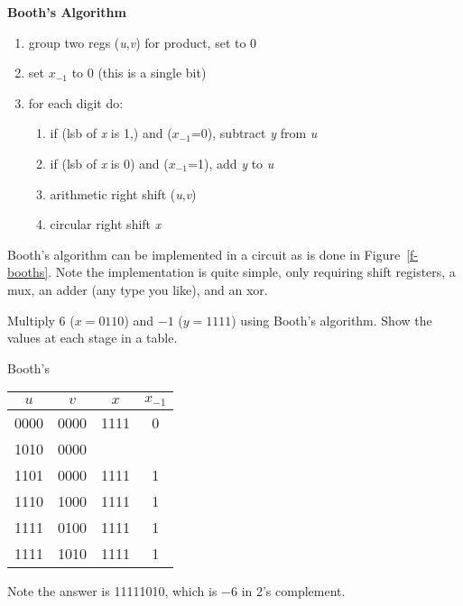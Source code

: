 \textbf{Booth's Algorithm}
\begin{enumerate}
    \item group two regs (\emph{u},\emph{v}) for product, set to 0
    \item set \emph{$x_{-1}$} to 0 (this is a single bit)
    \item for each digit do:
    \begin{enumerate}
        \item if (lsb of \emph{x} is 1,) and (\emph{$x_{-1}$}=0), subtract \emph{y} from \emph{u}
        \item if (lsb of \emph{x} is 0) and (\emph{$x_{-1}$}=1), add \emph{y} to \emph{u}
        \item arithmetic right shift (\emph{u},\emph{v})
        \item circular right shift \emph{x}
    \end{enumerate}
\end{enumerate}

Booth's algorithm can be implemented in a circuit as is done in Figure~\ref{f-booths}.  Note the implementation is quite simple, only requiring shift registers, a mux, an adder (any type you like), and an xor.



\begin{example}
Multiply $6$ ($x=0110$) and $-1$ ($y=1111$) using Booth's algorithm.  Show the values at each stage in a table.

       {\color{ans}
       Booth's

       \begin{tabular}{cccc}
         $u$ & $v$ & $x$ & $x_{-1}$ \\ \hline
         0000 & 0000 & 1111 & 0 \\ \hline
         1010 & 0000 &   &   \\
         1101 & 0000 & 1111 & 1 \\ \hline
         1110 & 1000 & 1111 & 1 \\ \hline
         1111 & 0100 & 1111 & 1 \\ \hline
         1111 & 1010 & 1111 & 1 \\
       \end{tabular}

       Note the answer is 11111010, which is $-6$ in 2's complement.
       }
\end{example}

